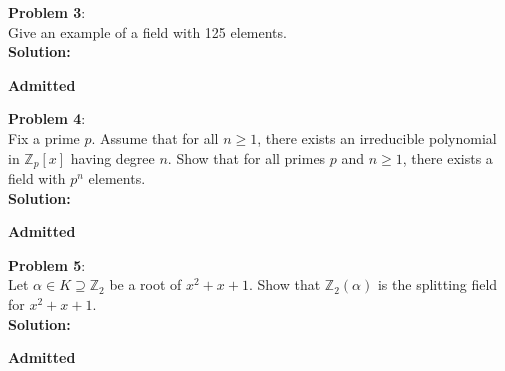 \documentclass[11pt]{article}
\newcommand{\prob}[3]{\begin{flushleft}
        \textbf{Problem #1}: \\
        #2 
		\textbf{Solution:} 
		#3

\end{flushleft}}
\newcommand{\admit}{
  \begin{flushright}
    \textbf{Admitted}
  \end{flushright}
}
\begin{document}
\prob{3}{
  Give an example of a field with 125 elements. \\
}{ \\
  \admit
}

\prob{4}{
Fix a prime $p$. Assume that for all $n \geq 1$, there exists an irreducible polynomial in $\mathbb{Z}_p[x]$ having degree $n$. Show that for all primes $p$ and $n \geq 1$, there exists a field with $p^n$ elements. \\
}{ \\
\admit
}

\prob{5}{
  Let $\alpha \in K \supseteq \mathbb{Z}_2$ be a root of $x^2 + x + 1$.
  Show that $\mathbb{Z}_2(\alpha)$ is the splitting field for $x^2 + x + 1$. \\
}{\\
  \admit
}
\end{document}
